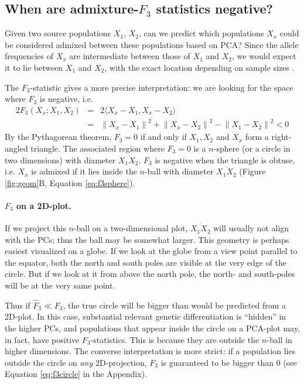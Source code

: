 \documentclass[12pt,fullpage, a4paper]{article}
\newcommand{\normsq}[1]{\left\lVert#1\right\rVert^2}
\begin{document}
\subsection{When are admixture-$F_3$ statistics negative?}
Given two source populations $X_1$, $X_2$, can we predict which populations $X_x$ could be considered admixed between these populations based on PCA? Since the allele frequencies of $X_x$ are intermediate between those of $X_1$ and $X_2$, we would expect it to lie between $X_1$ and $X_2$, with the exact location depending on sample sizes \citep{brisbin2012, mcvean2009}. 

The $F_3$-statistic gives a more precise interpretation: we are looking for the space where $F_3$ is negative, i.e. 
\begin{eqnarray}
2 F_3(X_x; X_1, X_2) &=& 2\langle  X_x - X_1, X_x - X_2 \rangle \nonumber\\
      &=& \normsq{X_x - X_1} + \normsq{X_x - X_2}  - \normsq{X_1 - X_2} < 0 \label{eq:f3neg}
\end{eqnarray}
By the Pythagorean theorem, $F_3 = 0 $ if and only if $X_1, X_2$ and $X_x$ form a right-angled triangle. The associated region where $F_3=0$ is a $n$-sphere (or a circle in two dimensions) with diameter $\overline{X_1X_2}$. $F_3$ is negative when the triangle is obtuse, i.e. $X_x$ is admixed if it lies inside the $n$-ball with diameter $\overline{X_1X_2}$ (Figure \ref{fig:geom}B, Equation \ref{eq:f3sphere}). 

\paragraph{$F_3$ on a 2D-plot.} 
 If we project this $n$-ball on a two-dimensional plot, $\overline{X_1X_2}$ will usually not align with the PCs; thus the ball may be somewhat larger. This geometry is perhaps easiest visualized on a globe. If we look at the globe from a view point parallel to the equator, both the north and south poles are visible at the very edge of the circle. But if we look at it from above the north pole, the north- and south-poles will be at the very same point.
 
 Thus if $\hat{F}_3 \ll F_3$, the true circle will be bigger than would be predicted from a 2D-plot. In this case, substantial relevant genetic differentiation is ``hidden'' in the higher PCs, and populations that appear inside the circle on a PCA-plot may, in fact, have positive $F_3$-statistics. This is because they are outside the $n$-ball in higher dimensions. The converse interpretation is more strict: if a population lies outside the circle on \emph{any} 2D-projection, $F_3$ is guaranteed to be bigger than 0 (see Equation \ref{eq:f3circle} in the Appendix).
\end{document}
